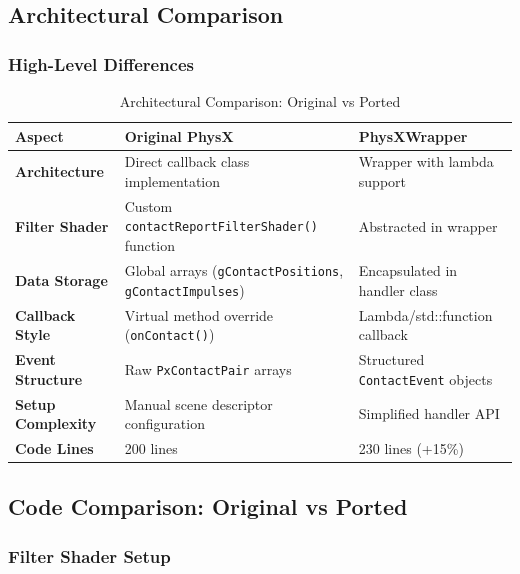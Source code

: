 
\subsection{Architectural Comparison}

\subsubsection{High-Level Differences}

\begin{table}[h]
\centering
\begin{tabular}{|l|p{5.5cm}|p{5.5cm}|}
\hline
\textbf{Aspect} & \textbf{Original PhysX} & \textbf{PhysXWrapper} \\
\hline
\textbf{Architecture} & Direct callback class implementation & Wrapper with lambda support \\
\hline
\textbf{Filter Shader} & Custom \texttt{contactReportFilterShader()} function & Abstracted in wrapper \\
\hline
\textbf{Data Storage} & Global arrays (\texttt{gContactPositions}, \texttt{gContactImpulses}) & Encapsulated in handler class \\
\hline
\textbf{Callback Style} & Virtual method override (\texttt{onContact()}) & Lambda/std::function callback \\
\hline
\textbf{Event Structure} & Raw \texttt{PxContactPair} arrays & Structured \texttt{ContactEvent} objects \\
\hline
\textbf{Setup Complexity} & Manual scene descriptor configuration & Simplified handler API \\
\hline
\textbf{Code Lines} & 200 lines & 230 lines (+15\%) \\
\hline
\end{tabular}
\caption{Architectural Comparison: Original vs Ported}
\end{table}


\subsection{Code Comparison: Original vs Ported}

\subsubsection{Filter Shader Setup}


